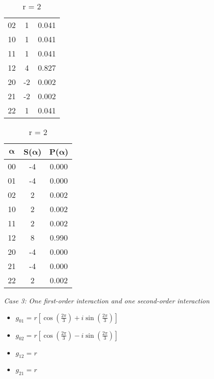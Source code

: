 \begin{table}[h]
\begin{subtable}{.3\textwidth}
\begin{tabular}{ccc}
            02 & 1 & 0.041 \\
            10 & 1 & 0.041 \\
            11 & 1 & 0.041 \\
            12 & 4 & 0.827 \\
            20 & -2 & 0.002 \\
            21 & -2 & 0.002 \\
            22 & 1 & 0.041 \\
          \bottomrule
        \end{tabular}
    \end{subtable}%
    \begin{subtable}{.3\textwidth}
        \centering
        \caption{r = 2}
        \begin{tabular}{ccc}
            \toprule
             $\boldsymbol{\alpha}$ & S($\boldsymbol{\alpha}$) & P($\boldsymbol{\alpha}$)\\
            \midrule
            00 & -4 & 0.000 \\
            01 & -4 & 0.000 \\
            02 & 2 & 0.002 \\
            10 & 2 & 0.002 \\
            11 & 2 & 0.002 \\
            12 & 8 & 0.990 \\
            20 & -4 & 0.000 \\
            21 & -4 & 0.000 \\
            22 & 2 & 0.002 \\
          \bottomrule
        \end{tabular}
    \end{subtable}
\end{table}

\noindent
\textit{Case 3: One first-order interaction and one second-order interaction}

\begin{itemize}
    \item $g_{01}$ = $r\left[\cos\left( \frac{2\pi}{3}\right) + i \sin\left( \frac{2\pi}{3}\right)\right]$
    \item $g_{02}$ = $r\left[\cos\left( \frac{2\pi}{3}\right) - i \sin\left( \frac{2\pi}{3}\right)\right]$
    \item $g_{12}$ = $r$
    \item $g_{21}$ = $r$
\end{itemize}

